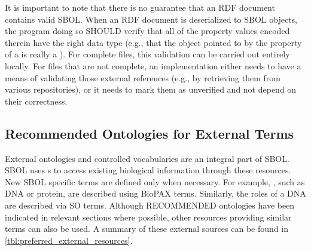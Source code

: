 It is important to note that there is no guarantee that an RDF document
contains valid SBOL. When an RDF document is deserialized to SBOL
objects, the program doing so SHOULD verify that all of the property
values encoded therein have the right data type (e.g., that the object
pointed to by the  property of a
 is really a ).
For complete files, this validation can be carried out entirely locally. For files that are not complete, an implementation either needs to
have a means of validating those external references (e.g., by
retrieving them from various repositories), or it needs to mark them as
unverified and not depend on their correctness.

\subsection{Recommended Ontologies for External Terms}
\label{sec:recomm_ontologies}

External ontologies and controlled vocabularies are an integral part of SBOL. SBOL uses s to access existing biological information through these resources. New SBOL specific terms are defined only when necessary. For example,  , such as DNA or protein, are described using BioPAX terms. Similarly, the roles of a DNA   are described via SO terms. Although RECOMMENDED ontologies have been indicated in relevant sections where possible, other resources providing similar terms can also be used. A summary of these external sources can be found in \ref{tbl:preferred_external_resources}.

